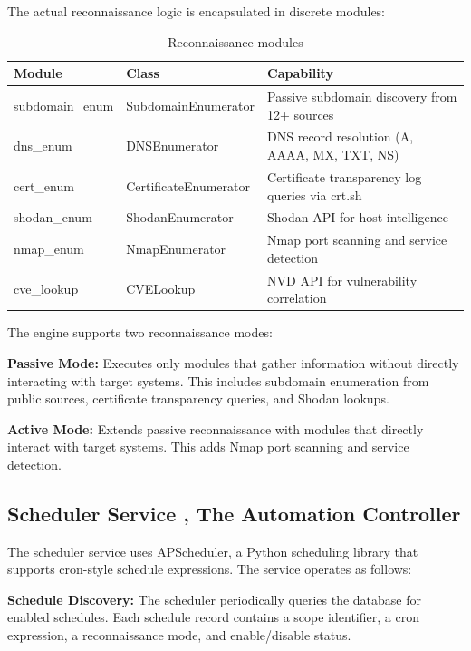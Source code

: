 \documentclass[a4paper,12pt]{report}
\begin{document}
The actual reconnaissance logic is encapsulated in discrete modules:\hfill \break

\begin{table}[H]
\centering
\caption{Reconnaissance modules}
\begin{tabular}{|l|l|l|}
\hline
\textbf{Module} & \textbf{Class} & \textbf{Capability} \\
\hline
subdomain\_enum & SubdomainEnumerator & Passive subdomain discovery from 12+ sources \\
\hline
dns\_enum & DNSEnumerator & DNS record resolution (A, AAAA, MX, TXT, NS) \\
\hline
cert\_enum & CertificateEnumerator & Certificate transparency \cite{cert_transparency} log queries via crt.sh \cite{crtsh_api} \\
\hline
shodan\_enum & ShodanEnumerator & Shodan \cite{shodan_api} API for host intelligence \\
\hline
nmap\_enum & NmapEnumerator & Nmap \cite{nmap_docs} port scanning and service detection \\
\hline
cve\_lookup & CVELookup & NVD \cite{nvd_api} API for vulnerability correlation \\
\hline
\end{tabular}
\label{tab:recon_modules}
\end{table}

The engine supports two reconnaissance modes:\hfill \break

\textbf{Passive Mode:} Executes only modules that gather information without directly interacting with target systems. This includes subdomain enumeration from public sources, certificate transparency queries, and Shodan lookups.\hfill \break

\textbf{Active Mode:} Extends passive reconnaissance with modules that directly interact with target systems. This adds Nmap port scanning and service detection.\hfill \break

\subsection{Scheduler Service ,  The Automation Controller}

The scheduler service uses APScheduler, a Python scheduling library that supports cron-style schedule expressions. The service operates as follows:\hfill \break

\textbf{Schedule Discovery:} The scheduler periodically queries the database for enabled schedules. Each schedule record contains a scope identifier, a cron expression, a reconnaissance mode, and enable/disable status.\hfill \break
\end{document}

